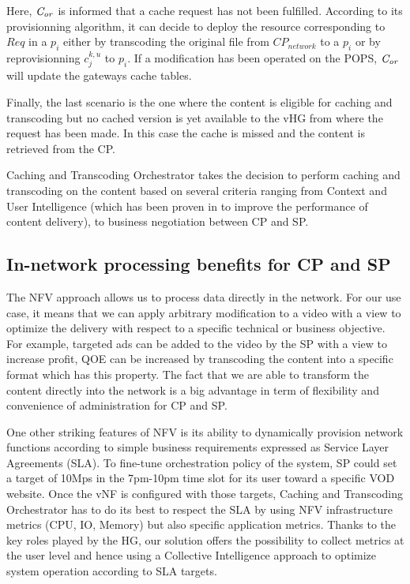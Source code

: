 Here, $\mathit{C_{or}}$ is informed that a cache request has not been fulfilled. According to its provisionning algorithm, it can decide to deploy the resource corresponding to $\mathit{Req}$ in a $p_{i}$ either by transcoding the original file from \(\mathit{CP}_{\mathit{network}}\) to a $p_{i}$ or by reprovisionning $c^{k,u}_{j}$ to $p_{i}$.
If a modification has been operated on the POPS, $\mathit{C_{or}}$ will update the gateways cache tables.

Finally, the last scenario is the one where the content is eligible for caching and transcoding but no cached version is yet available to the vHG from where the request has been made.
In this case the cache is missed and the content is retrieved from the CP.

Caching and Transcoding Orchestrator takes the decision to perform caching and transcoding on the content based on several criteria ranging from Context and User Intelligence (which has been proven in \cite{wang_cpcdn:_2015} to improve the performance of content delivery), to business negotiation between CP and SP.

\subsection{In-network processing benefits for CP and SP}
The NFV approach allows us to process data directly in the network.
For our use case, it means that we can apply arbitrary modification to a video with a view to optimize the delivery with respect to a specific technical or business objective.
For example, targeted ads can be added to the video by the SP with a view to increase profit, QOE can be increased by transcoding the content into a specific format which has this property.
The fact that we are able to transform the content directly into the network is a big advantage in term of flexibility and convenience of administration for CP and SP.

One other striking features of NFV is its ability to dynamically provision network functions according to simple business requirements expressed as Service Layer Agreements (SLA).
To fine-tune orchestration policy of the system, SP could set a target of 10Mps in the 7pm-10pm time slot for its user toward a specific VOD website.
Once the vNF is configured with those targets, Caching and Transcoding Orchestrator has to do its best to respect the SLA by using NFV infrastructure metrics (CPU, IO, Memory) but also specific application metrics.
Thanks to the key roles played by the HG, our solution offers the possibility to collect metrics at the user level and hence using a Collective Intelligence approach to optimize system operation according to SLA targets. 


